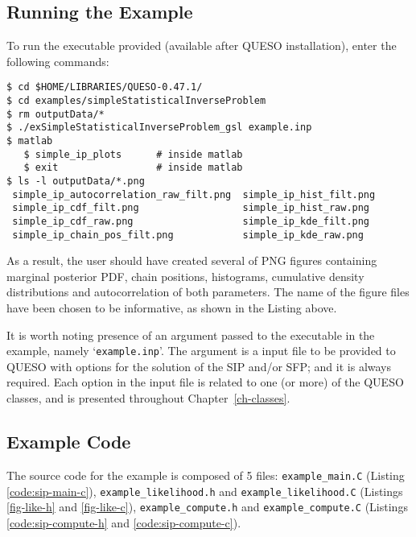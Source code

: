 \subsection{Running the Example}\label{sec:sip-run}
 
To run the executable provided (available after QUESO installation), enter the following commands:
\begin{lstlisting}[label={},caption={}]
$ cd $HOME/LIBRARIES/QUESO-0.47.1/
$ cd examples/simpleStatisticalInverseProblem
$ rm outputData/*
$ ./exSimpleStatisticalInverseProblem_gsl example.inp    
$ matlab
   $ simple_ip_plots      # inside matlab
   $ exit                 # inside matlab
$ ls -l outputData/*.png
 simple_ip_autocorrelation_raw_filt.png  simple_ip_hist_filt.png 
 simple_ip_cdf_filt.png                  simple_ip_hist_raw.png
 simple_ip_cdf_raw.png                   simple_ip_kde_filt.png
 simple_ip_chain_pos_filt.png            simple_ip_kde_raw.png
\end{lstlisting}

As a result, the user should have created several of PNG figures containing marginal posterior PDF, chain positions, histograms, cumulative density distributions and autocorrelation of both parameters. The name of the figure files have been chosen to be informative, as shown in the Listing above. 

It is worth noting presence of an argument passed to the executable in the
example, namely `\verb+example.inp+'. The argument is a input file to be provided to QUESO with options for
the solution of the SIP and/or SFP; and it is always required. Each option in
the input file is related to one (or more) of the QUESO classes, and is
presented throughout Chapter~\ref{ch-classes}. 


\subsection{Example Code}\label{sec:sip-code}

The source code for the example is composed of 5 files:
\texttt{example\_main.C} (Listing \ref{code:sip-main-c}), \linebreak
\texttt{example\_likelihood.h} and \texttt{example\_likelihood.C} (Listings \ref{fig-like-h} and \ref{fig-like-c}),
\texttt{example\_compute.h} and \texttt{example\_compute.C} (Listings \ref{code:sip-compute-h} and \ref{code:sip-compute-c}).




